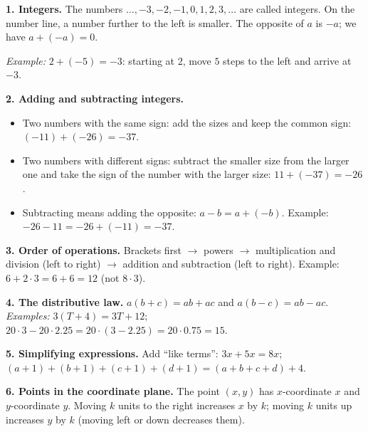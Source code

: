 \begin{knowbox}
\textbf{1. Integers.} The numbers $\dots,-3,-2,-1,0,1,2,3,\dots$ are called integers. On the number line, a number further to the
left is smaller. The opposite of $a$ is $-a$; we have $a+(-a)=0$.
\begin{center}\end{center}
\emph{Example:} $2+(-5)=-3$: starting at $2$, move $5$ steps to the left and arrive at $-3$.

\textbf{2. Adding and subtracting integers.}
\begin{itemize}[leftmargin=1.4em,itemsep=1pt,topsep=2pt]
\item Two numbers with the same sign: add the sizes and keep the common sign: $(-11)+(-26)=-37$.
\item Two numbers with different signs: subtract the smaller size from the larger one and take the sign of the number with the larger size: $11+(-37)=-26$.
\item Subtracting means adding the opposite: $a-b=a+(-b)$. Example: $-26-11=-26+(-11)=-37$.
\end{itemize}

\textbf{3. Order of operations.} Brackets first $\to$ powers $\to$ multiplication and division (left to right)
$\to$ addition and subtraction (left to right). Example: $6+2\cdot 3=6+6=12$ (not $8\cdot 3$).

\textbf{4. The distributive law.} $a(b+c)=ab+ac$ and $a(b-c)=ab-ac$.
\emph{Examples:} $3(T+4)=3T+12$;\quad $20\cdot 3-20\cdot 2.25=20\cdot(3-2.25)=20\cdot 0.75=15$.

\textbf{5. Simplifying expressions.} Add ``like terms'': $3x+5x=8x$; \
$(a+1)+(b+1)+(c+1)+(d+1)=(a+b+c+d)+4$.

\textbf{6. Points in the coordinate plane.} The point $(x,y)$ has $x$-coordinate $x$ and $y$-coordinate $y$. Moving $k$ units
to the right increases $x$ by $k$; moving $k$ units up increases $y$ by $k$ (moving left or down decreases them).
\end{knowbox}

